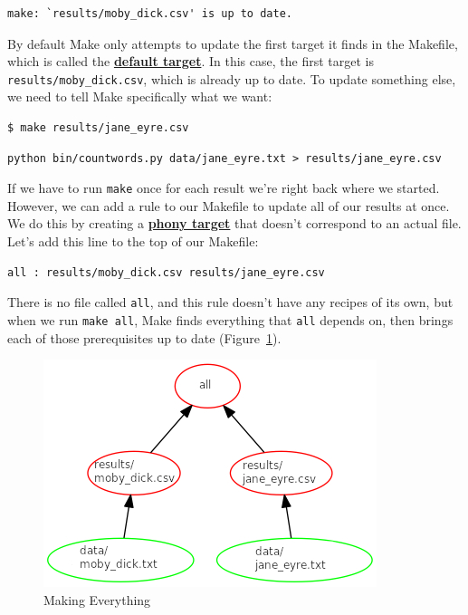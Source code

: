 \documentclass[
]{krantz}
\newcommand{\gref}[2]{\hyperlink{#2}{\textbf{#1}}}
\begin{document}
\begin{verbatim}
make: `results/moby_dick.csv' is up to date.
\end{verbatim}

By default Make only attempts to update the first target it finds in the Makefile,
which is called the \gref{default target}{default\_target}.
In this case,
the first target is \texttt{results/moby\_dick.csv},
which is already up to date.
To update something else,
we need to tell Make specifically what we want:

\begin{verbatim}
$ make results/jane_eyre.csv
\end{verbatim}

\begin{verbatim}
python bin/countwords.py data/jane_eyre.txt > results/jane_eyre.csv
\end{verbatim}

If we have to run \texttt{make} once for each result
we're right back where we started.
However,
we can add a rule to our Makefile to update all of our results at once.
We do this by creating a \gref{phony target}{phony\_target}
that doesn't correspond to an actual file.
Let's add this line to the top of our Makefile:

\begin{verbatim}
all : results/moby_dick.csv results/jane_eyre.csv
\end{verbatim}

There is no file called \texttt{all},
and this rule doesn't have any recipes of its own,
but when we run \texttt{make\ all},
Make finds everything that \texttt{all} depends on,
then brings each of those prerequisites up to date (Figure~\ref{fig:automate-all}).

\begin{figure}

{\centering \includegraphics[width=0.6\linewidth]{figures/automate/make-dependency-graph} 

}

\caption{Making Everything}\label{fig:automate-all}
\end{figure}
\end{document}
